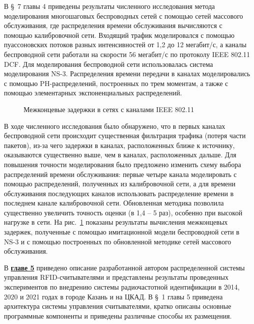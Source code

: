 В \S~7 главы 4 приведены результаты численного исследования метода моделирования многошаговых беспроводных сетей с помощью сетей массового обслуживания, где распределения времени обслуживания вычисляются с помощью калибровочной сети. Входящий трафик моделировался с помощью пуассоновских потоков разных интенсивностей от 1,2 до 12 мегабит/с, а каналы беспроводной сети работали на скорости 56 мегабит/с по протоколу IEEE 802.11 DCF. Для моделирования беспроводной сети использовалась система моделирования NS-3. Распределения времени передачи в каналах моделировались с помощью PH-распределений, построенных по трем моментам, а также с помощью элементарных экспоненциальных распределений.

\begin{figure}[ht!]
  \caption{Межконцевые задержки в сетях с каналами IEEE 802.11}\label{fig:tandem_delays}
\end{figure}

В ходе численного исследования было обнаружено, что в первых каналах беспроводной сети происходит существенная фильтрация трафика (потеря части пакетов), из-за чего задержки в каналах, расположенных ближе к источнику, оказываются существенно выше, чем в каналах, расположенных дальше. Для повышения точности моделирования было предложено изменить схему выбора распределений времени обслуживания: первые четыре канала моделировать с помощью распределений, полученных из калибровочной сети, а для времени обслуживания последующих каналов использовать распределение времени в последнем канале калибровочной сети. Обновленная методика позволила существенно увеличить точность оценки (в 1,4 -- 5 раз), особенно при высокой нагрузке в сети. На рис.~\ref{fig:tandem_delays} показаны результаты вычисления межконцевых задержек, полученные с помощью имитационной модели беспроводной сети в NS-3 и с помощью построенных по обновленной методике сетей массового обслуживания.



В \textbf{\underline{главе 5}}
приведено описание разработанной автором распределенной системы управления RFID-считывателями и представлены результаты проведенных экспериментов по внедрению системы радиочастотной идентификации в 2014, 2020 и 2021 годах в городе Казань и на ЦКАД. В \S~1 главы 5 приведена архитектура системы управления считывателями, кратко описаны основные программные компоненты и приведены различные способы их размещения.

